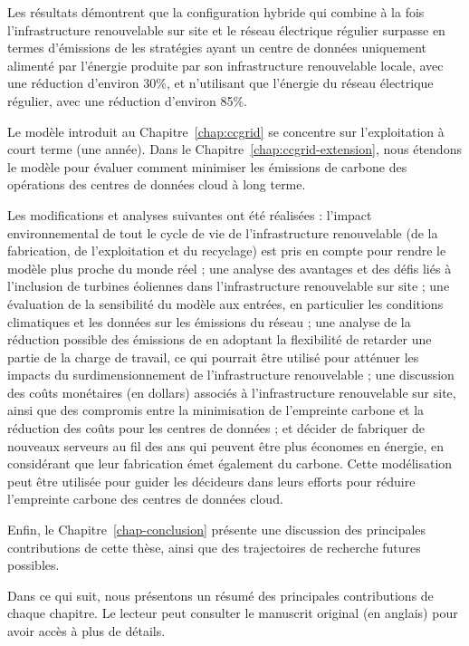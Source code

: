 Les résultats démontrent que la configuration hybride qui combine à la fois l'infrastructure renouvelable sur site et le réseau électrique régulier surpasse en termes d'émissions de  les stratégies ayant un centre de données uniquement alimenté par l'énergie produite par son infrastructure renouvelable locale, avec une réduction d'environ 30\%, et n'utilisant que l'énergie du réseau électrique régulier, avec une réduction d'environ 85\%.

Le modèle introduit au Chapitre~\ref{chap:ccgrid} se concentre sur l'exploitation à court terme (une année). Dans le Chapitre~\ref{chap:ccgrid-extension}, nous étendons le modèle pour évaluer comment minimiser les émissions de carbone des opérations des centres de données cloud à long terme.

Les modifications et analyses suivantes ont été réalisées : l'impact environnemental de tout le cycle de vie de l'infrastructure renouvelable (de la fabrication, de l'exploitation et du recyclage) est pris en compte pour rendre le modèle plus proche du monde réel ; une analyse des avantages et des défis liés à l'inclusion de turbines éoliennes dans l'infrastructure renouvelable sur site ; une évaluation de la sensibilité du modèle aux entrées, en particulier les conditions climatiques et les données sur les émissions du réseau ; une analyse de la réduction possible des émissions de  en adoptant la flexibilité de retarder une partie de la charge de travail, ce qui pourrait être utilisé pour atténuer les impacts du surdimensionnement de l'infrastructure renouvelable ; une discussion des coûts monétaires (en dollars) associés à l'infrastructure renouvelable sur site, ainsi que des compromis entre la minimisation de l'empreinte carbone et la réduction des coûts pour les centres de données ; et décider de fabriquer de nouveaux serveurs au fil des ans qui peuvent être plus économes en énergie, en considérant que leur fabrication émet également du carbone. Cette modélisation peut être utilisée pour guider les décideurs dans leurs efforts pour réduire l'empreinte carbone des centres de données cloud.

Enfin, le Chapitre~\ref{chap-conclusion} présente une discussion des principales contributions de cette thèse, ainsi que des trajectoires de recherche futures possibles.

Dans ce qui suit, nous présentons un résumé des principales contributions de chaque chapitre. Le lecteur peut consulter le manuscrit original (en anglais) pour avoir accès à plus de détails.


